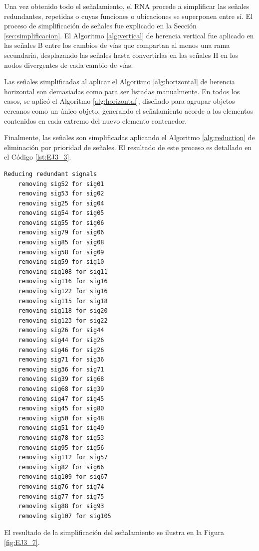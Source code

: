 	Una vez obtenido todo el señalamiento, el RNA procede a simplificar las señales redundantes, repetidas o cuyas funciones o ubicaciones se superponen entre sí. El proceso de simplificación de señales fue explicado en la Sección \ref{sec:simplificacion}. El Algoritmo \ref{alg:vertical} de herencia vertical fue aplicado en las señales B entre los cambios de vías que compartan al menos una rama secundaria, desplazando las señales hasta convertirlas en las señales H en los nodos divergentes de cada cambio de vías. 
	
	Las señales simplificadas al aplicar el Algoritmo \ref{alg:horizontal} de herencia horizontal son demasiadas como para ser listadas manualmente. En todos los casos, se aplicó el Algoritmo \ref{alg:horizontal}, diseñado para agrupar objetos cercanos como un único objeto, generando el señalamiento acorde a los elementos contenidos en cada extremo del nuevo elemento contenedor.
	
	Finalmente, las señales son simplificadas aplicando el Algoritmo \ref{alg:reduction} de eliminación por prioridad de señales. El resultado de este proceso es detallado en el Código \ref{lst:EJ3_3}.
	
	\begin{lstlisting}[language = {}, tabsize=4, basicstyle=\footnotesize\ttfamily, showspaces=false, showstringspaces=false, caption = Reducción de señalamiento por prioridad de señales, label = {lst:EJ3_3}]
	Reducing redundant signals
	removing sig52 for sig01
	removing sig53 for sig02
	removing sig25 for sig04
	removing sig54 for sig05
	removing sig55 for sig06
	removing sig79 for sig06
	removing sig85 for sig08
	removing sig58 for sig09
	removing sig59 for sig10
	removing sig108 for sig11
	removing sig116 for sig16
	removing sig122 for sig16
	removing sig115 for sig18
	removing sig118 for sig20
	removing sig123 for sig22
	removing sig26 for sig44
	removing sig44 for sig26
	removing sig46 for sig26
	removing sig71 for sig36
	removing sig36 for sig71
	removing sig39 for sig68
	removing sig68 for sig39
	removing sig47 for sig45
	removing sig45 for sig80
	removing sig50 for sig48
	removing sig51 for sig49
	removing sig78 for sig53
	removing sig95 for sig56
	removing sig112 for sig57
	removing sig82 for sig66
	removing sig109 for sig67
	removing sig76 for sig74
	removing sig77 for sig75
	removing sig88 for sig93
	removing sig107 for sig105
	\end{lstlisting}
	
	El resultado de la simplificación del señalamiento se ilustra en la Figura \ref{fig:EJ3_7}.
	
